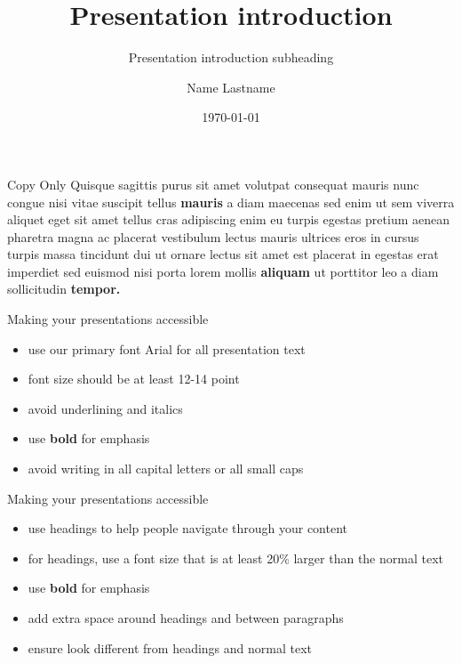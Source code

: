 \documentclass[aspectratio=169, 12pt]{beamer} %
\author[]{Name Lastname}
\title[]{Presentation introduction}
\subtitle[]{Presentation introduction subheading}
\institute{MRC Biostatistics Unit}
\date{\today}
\begin{document}
\begin{frame}[plain]
\titlepage
\setcounter{framenumber}{0}
\end{frame}
%

\begin{frame}[t]{Copy Only}
    Quisque sagittis purus sit amet volutpat consequat mauris nunc congue nisi vitae suscipit tellus \textbf{mauris} a diam maecenas sed enim ut sem viverra aliquet eget sit amet tellus cras adipiscing enim eu turpis egestas pretium aenean pharetra magna ac placerat vestibulum lectus mauris ultrices eros in cursus turpis massa tincidunt dui ut ornare lectus sit amet est placerat in egestas erat imperdiet sed euismod nisi porta lorem mollis \textbf{aliquam} ut porttitor leo a diam sollicitudin \textbf{tempor.}
\end{frame}

\begin{frame}[t]{Making your presentations accessible}
  \begin{itemize}
    \item use our primary font Arial for all presentation text
    \item font size should be at least 12-14 point
    \item avoid underlining and italics
    \item use \textbf{bold} for emphasis
    \item avoid writing in all capital letters or all small caps
  \end{itemize}
\end{frame}

\begin{frame}[t]{Making your presentations accessible}
    \begin{itemize}
      \item use headings to help people navigate through your content
      \item for headings, use a font size that is at least 20\% larger than the normal text
      \item use \textbf{bold} for emphasis
      \item add extra space around headings and between paragraphs
      \item ensure \alert{\underline{}} look different from headings and normal text
    \end{itemize}
  \end{frame}
\end{document}
